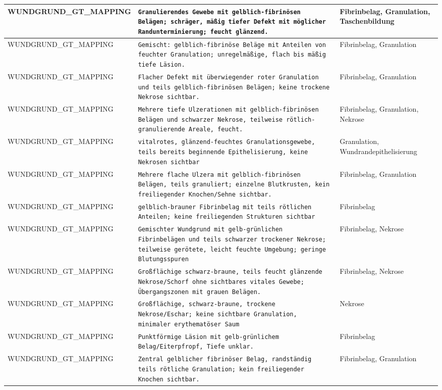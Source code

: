 \begin{longtable}{|p{3.5cm}|p{5cm}|p{6.5cm}|}
WUNDGRUND\_GT\_MAPPING & \texttt{Granulierendes Gewebe mit gelblich-fibrinösen Belägen; schräger, mäßig tiefer Defekt mit möglicher Randunterminierung; feucht glänzend.} & Fibrinbelag, Granulation, Taschenbildung \\ \hline
WUNDGRUND\_GT\_MAPPING & \texttt{Gemischt: gelblich-fibrinöse Beläge mit Anteilen von feuchter Granulation; unregelmäßige, flach bis mäßig tiefe Läsion.} & Fibrinbelag, Granulation \\ \hline
WUNDGRUND\_GT\_MAPPING & \texttt{Flacher Defekt mit überwiegender roter Granulation und teils gelblich-fibrinösen Belägen; keine trockene Nekrose sichtbar.} & Fibrinbelag, Granulation \\ \hline
WUNDGRUND\_GT\_MAPPING & \texttt{Mehrere tiefe Ulzerationen mit gelblich-fibrinösen Belägen und schwarzer Nekrose, teilweise rötlich-granulierende Areale, feucht.} & Fibrinbelag, Granulation, Nekrose \\ \hline
WUNDGRUND\_GT\_MAPPING & \texttt{vitalrotes, glänzend-feuchtes Granulationsgewebe, teils bereits beginnende Epithelisierung, keine Nekrosen sichtbar} & Granulation, Wundrandepithelisierung \\ \hline
WUNDGRUND\_GT\_MAPPING & \texttt{Mehrere flache Ulzera mit gelblich-fibrinösen Belägen, teils granuliert; einzelne Blutkrusten, kein freiliegender Knochen/Sehne sichtbar.} & Fibrinbelag, Granulation \\ \hline
WUNDGRUND\_GT\_MAPPING & \texttt{gelblich-brauner Fibrinbelag mit teils rötlichen Anteilen; keine freiliegenden Strukturen sichtbar} & Fibrinbelag \\ \hline
WUNDGRUND\_GT\_MAPPING & \texttt{Gemischter Wundgrund mit gelb-grünlichen Fibrinbelägen und teils schwarzer trockener Nekrose; teilweise gerötete, leicht feuchte Umgebung; geringe Blutungsspuren} & Fibrinbelag, Nekrose \\ \hline
WUNDGRUND\_GT\_MAPPING & \texttt{Großflächige schwarz-braune, teils feucht glänzende Nekrose/Schorf ohne sichtbares vitales Gewebe; Übergangszonen mit grauen Belägen.} & Fibrinbelag, Nekrose \\ \hline
WUNDGRUND\_GT\_MAPPING & \texttt{Großflächige, schwarz-braune, trockene Nekrose/Eschar; keine sichtbare Granulation, minimaler erythematöser Saum} & Nekrose \\ \hline
WUNDGRUND\_GT\_MAPPING & \texttt{Punktförmige Läsion mit gelb-grünlichem Belag/Eiterpfropf, Tiefe unklar.} & Fibrinbelag \\ \hline
WUNDGRUND\_GT\_MAPPING & \texttt{Zentral gelblicher fibrinöser Belag, randständig teils rötliche Granulation; kein freiliegender Knochen sichtbar.} & Fibrinbelag, Granulation \\ \hline

\end{longtable}
